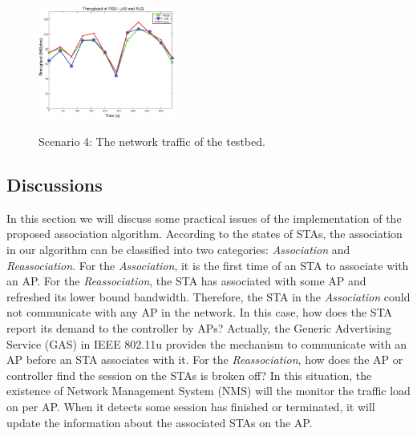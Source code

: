 \documentclass[conference]{IEEEtran}
\def\figwidth{0.4\textwidth}
\begin{document}
  \begin{figure}
    \centering
    \includegraphics[width=\figwidth]{testbed.eps}\\
    \caption{Scenario 4: The network traffic of the testbed. }\label{fig:testbed}
  \end{figure}

  \subsection{Discussions}\label{sec:discussions}
  In this section we will discuss some practical issues of the implementation of the proposed association algorithm.  According to the states of STAs, the association in our algorithm can be classified into two categories: \textit{Association} and \textit{Reassociation}.  For the \textit{Association}, it is the first time of an STA to associate with an AP.  For the \textit{Reassociation}, the STA has associated with some AP and refreshed its lower bound bandwidth.  Therefore, the STA in the \textit{Association} could not communicate with any AP in the network.  In this case, how does the STA report its demand to the controller by APs?  Actually, the Generic Advertising Service (GAS) in IEEE 802.11u provides the mechanism to communicate with an AP before an STA associates with it.  For the \textit{Reassociation}, how does the AP or controller find the session on the STAs is broken off?  In this situation, the existence of Network Management System (NMS) will the monitor the traffic load on per AP.  When it detects some session has finished or terminated, it will update the information about the associated STAs on the AP.
\end{document}
